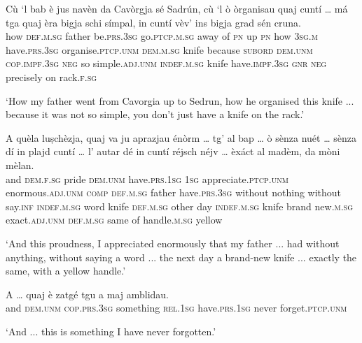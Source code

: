 \begin{linenumbers}
	\gll Cù `l bab è jus navèn da Cavòrgja sé Sadrún, cù `l ò òrganisau quaj cuntí … má tga quaj èra bigja schi símpal, in cuntí vèv’ ins bigja grad sén cruna.\\
	how \textsc{def.m.sg} father be.\textsc{prs.3sg} go.\textsc{ptcp.m.sg} away of \textsc{pn} up \textsc{pn} how \textsc{3sg.m} have.\textsc{prs.3sg} organise.\textsc{ptcp.unm} \textsc{dem.m.sg} knife {} because \textsc{subord} \textsc{dem.unm} \textsc{cop.impf.3sg} \textsc{neg} so simple.\textsc{adj.unm} \textsc{indef.m.sg} knife have.\textsc{impf.3sg} \textsc{gnr} \textsc{neg} precisely on rack.\textsc{f.sg}\\
\end{linenumbers}
\medskip
\glt `How my father went from Cavorgia up to Sedrun, how he organised this knife ... because it was not so simple, you don't just have a knife on the rack.'
\medskip

\begin{linenumbers}
	\gll A quèla luṣchèzja, quaj va ju aprazjau énòrm … tg’ al bap … ò sènza nuét … sènza dí in plajd\footnotemark{} cuntí … l’ autar dé in cuntí réjsch néjv … èxáct al madèm, da mòni mèlan.\\    and \textsc{dem.f.sg} pride \textsc{dem.unm} have.\textsc{prs.1sg} \textsc{1sg} appreciate.\textsc{ptcp.unm} enormous.\textsc{adj.unm} {} \textsc{comp} \textsc{def.m.sg} father {} have.\textsc{prs.3sg} without nothing {} without say.\textsc{inf} \textsc{indef.m.sg} word knife {} \textsc{def.m.sg} other day \textsc{indef.m.sg} knife brand new.\textsc{m.sg} {} exact.\textsc{adj.unm} \textsc{def.m.sg} same of handle.\textsc{m.sg} yellow\\
\end{linenumbers}
\medskip
\glt `And this proudness, I appreciated enormously that my father ... had without anything, without saying a word ... the next day a brand-new knife ... exactly the same, with a yellow handle.'
\medskip

\begin{linenumbers}
	\gll A … quaj è zatgé tgu a maj amblidau.   \\
and {} \textsc{dem.unm} \textsc{cop.prs.3sg} something \textsc{rel.1sg} have.\textsc{prs.1sg} never forget.\textsc{ptcp.unm}	\\
\end{linenumbers}
\medskip
\glt `And ... this is something I have never forgotten.'
\medskip



